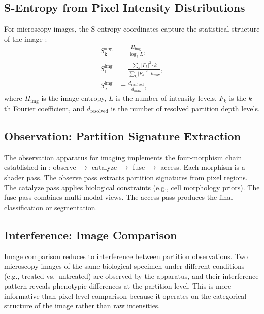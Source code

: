 \documentclass[11pt,twocolumn,a4paper]{article}
\theoremstyle{definition}
\theoremstyle{remark}
\newcommand{\Sk}{S_{\mathrm{k}}}
\newcommand{\St}{S_{\mathrm{t}}}
\newcommand{\Se}{S_{\mathrm{e}}}
\begin{document}
\subsection{S-Entropy from Pixel Intensity Distributions}

For microscopy images, the S-entropy coordinates capture the statistical structure of the image \citep{sachikonye2025_partition}:
\begin{align}
\Sk^{\mathrm{img}} &= \frac{H_{\mathrm{img}}}{\log_2 L}, \label{eq:sk_img} \\
\St^{\mathrm{img}} &= \frac{\sum_k |F_k|^2 \cdot k}{\sum_k |F_k|^2 \cdot k_{\max}}, \label{eq:st_img} \\
\Se^{\mathrm{img}} &= \frac{d_{\mathrm{resolved}}}{d_{\max}}, \label{eq:se_img}
\end{align}
where $H_{\mathrm{img}}$ is the image entropy, $L$ is the number of intensity levels, $F_k$ is the $k$-th Fourier coefficient, and $d_{\mathrm{resolved}}$ is the number of resolved partition depth levels.

\subsection{Observation: Partition Signature Extraction}

The observation apparatus for imaging implements the four-morphism chain established in \citet{sachikonye2025_partition}: observe $\to$ catalyze $\to$ fuse $\to$ access. Each morphism is a shader pass. The observe pass extracts partition signatures from pixel regions. The catalyze pass applies biological constraints (e.g., cell morphology priors). The fuse pass combines multi-modal views. The access pass produces the final classification or segmentation.

\subsection{Interference: Image Comparison}

Image comparison reduces to interference between partition observations. Two microscopy images of the same biological specimen under different conditions (e.g., treated vs.\ untreated) are observed by the apparatus, and their interference pattern reveals phenotypic differences at the partition level. This is more informative than pixel-level comparison because it operates on the categorical structure of the image rather than raw intensities.


\end{document}
